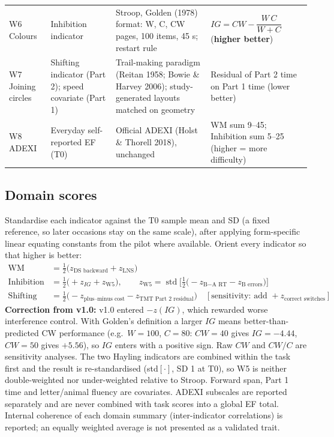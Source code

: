\documentclass[11pt,a4paper]{article}
\begin{document}
\begin{longtable}{@{}p{2.3cm}p{3.0cm}p{5.0cm}p{4.6cm}@{}}
W6 Colours & Inhibition indicator & Stroop, Golden (1978) format: W, C, CW pages, 100 items, 45 s; restart rule & $IG = CW - \dfrac{W\,C}{W+C}$ (\textbf{higher better}) \\
W7 Joining circles & Shifting indicator (Part 2); speed covariate (Part 1) & Trail-making paradigm (Reitan 1958; Bowie \& Harvey 2006); study-generated layouts matched on geometry & Residual of Part 2 time on Part 1 time (lower better) \\
W8 ADEXI & Everyday self-reported EF (T0) & Official ADEXI (Holst \& Thorell 2018), unchanged & WM sum 9--45; Inhibition sum 5--25 (higher = more difficulty) \\
\bottomrule
\end{longtable}

\subsection*{Domain scores}
Standardise each indicator against the T0 sample mean and SD (a fixed reference, so later occasions stay on the same scale), after applying form-specific linear equating constants from the pilot where available. Orient every indicator so that higher is better:
\begin{align*}
\text{WM} &= \tfrac12\big(z_{\text{DS backward}} + z_{\text{LNS}}\big)\\
\text{Inhibition} &= \tfrac12\big(+z_{IG} + z_{\text{W5}}\big),\qquad z_{\text{W5}} = \operatorname{std}\!\Big[\tfrac12\big(-z_{\text{B$-$A RT}} - z_{\text{B errors}}\big)\Big]\\
\text{Shifting} &= \tfrac12\big(-z_{\text{plus--minus cost}} - z_{\text{TMT Part 2 residual}}\big)\quad[\text{sensitivity: add } +z_{\text{correct switches}}]
\end{align*}
\textbf{Correction from v1.0:} v1.0 entered $-z(IG)$, which rewarded worse interference control. With Golden's definition a larger $IG$ means better-than-predicted CW performance (e.g.\ $W=100$, $C=80$: $CW=40$ gives $IG=-4.44$, $CW=50$ gives $+5.56$), so $IG$ enters with a positive sign. Raw $CW$ and $CW/C$ are sensitivity analyses. The two Hayling indicators are combined within the task first and the result is re-standardised (std$[\cdot]$, SD 1 at T0), so W5 is neither double-weighted nor under-weighted relative to Stroop. Forward span, Part 1 time and letter/animal fluency are covariates. ADEXI subscales are reported separately and are never combined with task scores into a global EF total. Internal coherence of each domain summary (inter-indicator correlations) is reported; an equally weighted average is not presented as a validated trait.
\end{document}
